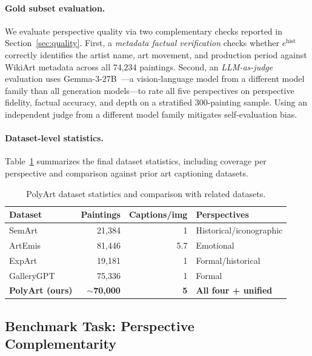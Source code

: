 \paragraph{Gold subset evaluation.}
We evaluate perspective quality via two complementary checks reported in Section~\ref{sec:quality}.
First, a \textit{metadata factual verification} checks whether $e^{\text{hist}}$ correctly identifies the artist name, art movement, and production period against WikiArt metadata across all 74,234 paintings.
Second, an \textit{LLM-as-judge} evaluation uses Gemma-3-27B~\cite{gemma3}---a vision-language model from a different model family than all generation models---to rate all five perspectives on perspective fidelity, factual accuracy, and depth on a stratified 300-painting sample.
Using an independent judge from a different model family mitigates self-evaluation bias.

\paragraph{Dataset-level statistics.}
Table~\ref{tab:dataset_stats} summarizes the final dataset statistics, including coverage per perspective and comparison against prior art captioning datasets.

\begin{table}[h]
\centering
\caption{PolyArt dataset statistics and comparison with related datasets.}
\label{tab:dataset_stats}
\begin{tabular}{lrrl}
\toprule
\textbf{Dataset} & \textbf{Paintings} & \textbf{Captions/img} & \textbf{Perspectives} \\
\midrule
SemArt~\cite{semart_2018}        & 21,384 & 1 & Historical/iconographic \\
ArtEmis~\cite{achlioptas2021artemis}       & 81,446 & 5.7 & Emotional \\
ExpArt~\cite{ExpArt_acl2024}          & 19,181 & 1 & Formal/historical \\
GalleryGPT~\cite{MM24GalleryGPT}     & 75,336 & 1 & Formal \\
\midrule
\textbf{PolyArt (ours)} & \textbf{$\sim$70,000} & \textbf{5} & \textbf{All four + unified} \\
\bottomrule
\end{tabular}
\end{table}

\subsection{Benchmark Task: Perspective Complementarity}

